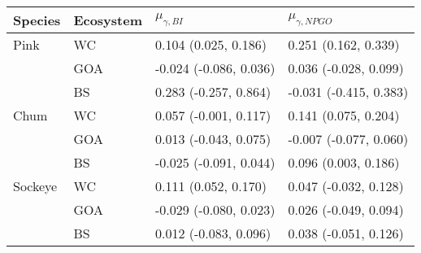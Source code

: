 \begin{tabular}{llll}
  \hline
Species & Ecosystem & $\mu_{\gamma,BI}$ & $\mu_{\gamma,NPGO}$ \\ 
  \hline
Pink & WC & 0.104 (0.025, 0.186) & 0.251 (0.162, 0.339) \\ 
   & GOA & -0.024 (-0.086, 0.036) & 0.036 (-0.028, 0.099) \\ 
   & BS & 0.283 (-0.257, 0.864) & -0.031 (-0.415, 0.383) \\ 
  Chum & WC & 0.057 (-0.001, 0.117) & 0.141 (0.075, 0.204) \\ 
   & GOA & 0.013 (-0.043, 0.075) & -0.007 (-0.077, 0.060) \\ 
   & BS & -0.025 (-0.091, 0.044) & 0.096 (0.003, 0.186) \\ 
  Sockeye & WC & 0.111 (0.052, 0.170) & 0.047 (-0.032, 0.128) \\ 
   & GOA & -0.029 (-0.080, 0.023) & 0.026 (-0.049, 0.094) \\ 
   & BS & 0.012 (-0.083, 0.096) & 0.038 (-0.051, 0.126) \\ 
   \hline
\end{tabular}
